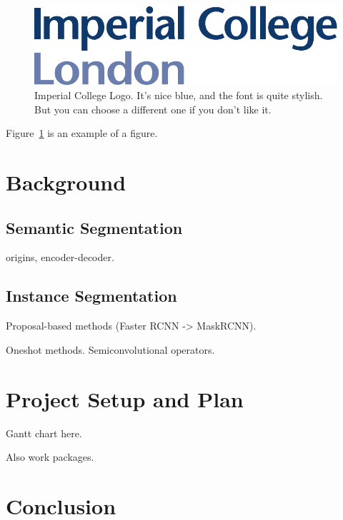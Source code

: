 \documentclass[12pt,twoside]{report}
\begin{document}
\begin{figure}[tb]
\centering
\includegraphics[width = 0.4\hsize]{./figures/imperial}
\caption{Imperial College Logo. It's nice blue, and the font is quite stylish. But you can choose a different one if you don't like it.}
\label{fig:logo}
\end{figure}

Figure~\ref{fig:logo} is an example of a figure. 

\chapter{Background}

\section{Semantic Segmentation}

origins, encoder-decoder.

\section{Instance Segmentation}

Proposal-based methods (Faster RCNN -> MaskRCNN).

Oneshot methods. Semiconvolutional operators.


\chapter{Project Setup and Plan}

Gantt chart here.

Also work packages.

\chapter{Conclusion}





\end{document}
